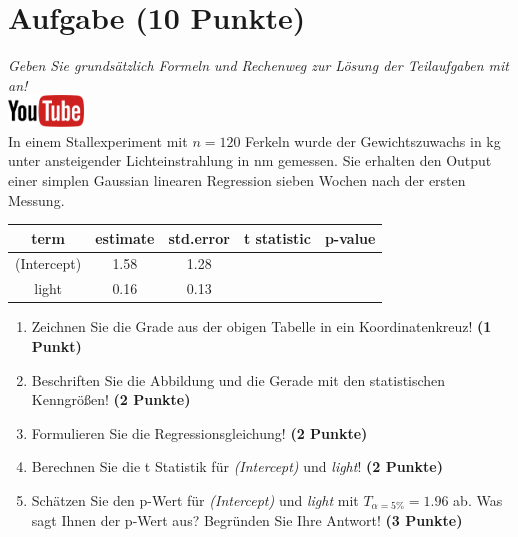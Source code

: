 \documentclass[a4paper, 9pt]{scrartcl}\usepackage[]{graphicx}\usepackage[]{xcolor}
\begin{document}
\section{Aufgabe \hfill (10 Punkte)}

\textit{Geben Sie grunds{\"a}tzlich Formeln und Rechenweg zur L{\"o}sung der
  Teilaufgaben mit an!} \\[1Ex]

\hfill\href{https://youtu.be/lJp8rFmMnrs}{\includegraphics[width =
  2cm]{img/youtube}}\\[1Ex]



In einem Stallexperiment mit $n = 120$ Ferkeln wurde der
Gewichtszuwachs in kg unter ansteigender Lichteinstrahlung in nm
gemessen. Sie erhalten den \Rlogo Output einer simplen Gaussian linearen
Regression sieben Wochen nach der ersten Messung.

\begin{table}[!h]
\centering\begingroup\fontsize{14}{16}\selectfont

\begin{tabular}{ccccc}
\toprule
term & estimate & std.error & t statistic & p-value\\
\midrule
(Intercept) & 1.58 & 1.28 &  & \\
light & 0.16 & 0.13 &  & \\
\bottomrule
\end{tabular}
\endgroup{}
\end{table}



\begin{enumerate}
\item Zeichnen Sie die Grade aus der obigen Tabelle in ein Koordinatenkreuz! \textbf{(1 Punkt)}
\item Beschriften Sie die Abbildung und die Gerade mit den statistischen
  Kenngr{\"o}{\ss}en! \textbf{(2 Punkte)}
\item Formulieren Sie die Regressionsgleichung! \textbf{(2 Punkte)}
\item Berechnen Sie die t Statistik f{\"u}r \textit{(Intercept)} und
  \textit{light}! \textbf{(2 Punkte)}
\item Sch{\"a}tzen Sie den p-Wert f{\"u}r \textit{(Intercept)} und
  \textit{light} mit $T_{\alpha = 5\%} = 1.96$ ab. Was sagt Ihnen der p-Wert aus?
  Begr{\"u}nden Sie Ihre Antwort! \textbf{(3 Punkte)}
\end{enumerate} 
\clearpage
\end{document}
